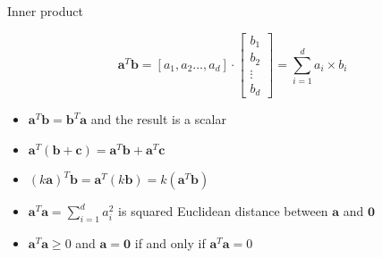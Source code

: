 \documentclass{scrartcl}
\def\tightlist{}
\newcommand{\vv}[1]{\boldsymbol{#1}}
\begin{document}
\begin{frame}{Inner product}
\protect\hypertarget{inner-product}{}

\[\vv{a}^T \vv{b} = [a_1, a_2\ldots, a_d] \cdot \begin{bmatrix}
            b_1 \\
            b_2 \\
           \vdots\\
            b_d
         \end{bmatrix} = \sum_{i=1}^d a_i\times b_i\]

\begin{itemize}
\tightlist
\item
  \(\vv{a}^T \vv{b} = \vv{b}^T\vv{a}\) and the result is a scalar
\item
  \(\vv{a}^T(\vv{b}+\vv{c}) = \vv{a}^T\vv{b}+ \vv{a}^T\vv{c}\)
\item
  \((k\vv{a})^T\vv{b} = \vv{a}^T(k\vv{b})= k(\vv{a}^T\vv{b})\)
\item
  \(\vv{a}^T \vv{a} = \sum_{i=1}^d a_i^2\) is squared Euclidean distance
  between \(\vv{a}\) and \(\vv{0}\)
\item
  \(\vv{a}^T \vv{a} \geq 0\) and \(\vv{a}=\vv{0}\) if and only if
  \(\vv{a}^T\vv{a} =0\)
\end{itemize}

\end{frame}
\end{document}
